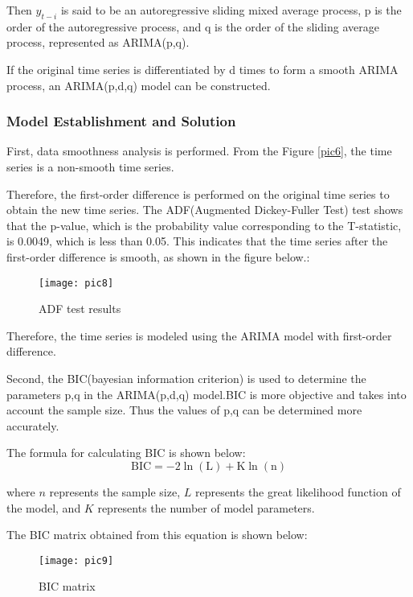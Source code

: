 \documentclass[12pt]{article}  %
\begin{document}
Then {$y_{t-i}$} is said to be an autoregressive sliding mixed average process, p is the order of the autoregressive process, and q is the order of the sliding average process, represented as ARIMA(p,q).

If the original time series is differentiated by d times to form a smooth ARIMA process, an ARIMA(p,d,q) model can be constructed.

\subsubsection{Model Establishment and Solution}
First, data smoothness analysis is performed. From the Figure \ref{pic6}, the time series is a non-smooth time series.

Therefore, the first-order difference is performed on the original time series to obtain the new time series. The ADF(Augmented Dickey-Fuller Test) test shows that the p-value, which is the probability value corresponding to the T-statistic, is 0.0049, which is less than 0.05. This indicates that the time series after the first-order difference is smooth, as shown in the figure below.:

\begin{figure}[htbp]  %
	\centering  %
	\texttt{[image: pic8]} %
	\caption{ADF test results}  
	\label{pic8}
\end{figure}

Therefore, the time series is modeled using the ARIMA model with first-order difference.

Second, the BIC(bayesian information criterion) is used to determine the parameters p,q in the ARIMA(p,d,q) model.BIC is more objective and takes into account the sample size. Thus the values of p,q can be determined more accurately.

The formula for calculating BIC is shown below:
\begin{equation}
	\mathrm{BIC}=-2 \ln (\mathrm{L})+\mathrm{K} \ln (\mathrm{n})
\end{equation}

where $n$ represents the sample size, $L$ represents the great likelihood function of the model, and $K$ represents the number of model parameters.

The BIC matrix obtained from this equation is shown below:
\begin{figure}[H]  %
	\centering  %
	\texttt{[image: pic9]} %
	\caption{BIC matrix}  
	\label{pic9}
\end{figure}
\vspace{-0.5cm}
\end{document}
